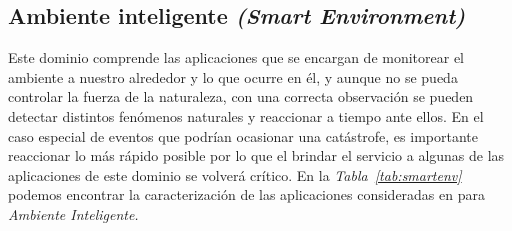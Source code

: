 \subsection{Ambiente inteligente \textit{(Smart Environment)}}

Este dominio comprende las aplicaciones que se encargan de monitorear el ambiente a nuestro alrededor y lo que ocurre en él, y aunque no se pueda controlar la fuerza de la naturaleza, con una correcta observación se pueden detectar distintos fenómenos naturales y reaccionar a tiempo ante ellos. En el caso especial de eventos que podrían ocasionar una catástrofe, es importante reaccionar lo más rápido posible por lo que el brindar el servicio a algunas de las aplicaciones de este dominio se volverá crítico. En la \textit{Tabla~\ref{tab:smartenv}} podemos encontrar la caracterización de las aplicaciones consideradas en \parencite{NetTrafficIoT} para \textit{Ambiente Inteligente.}\newline


